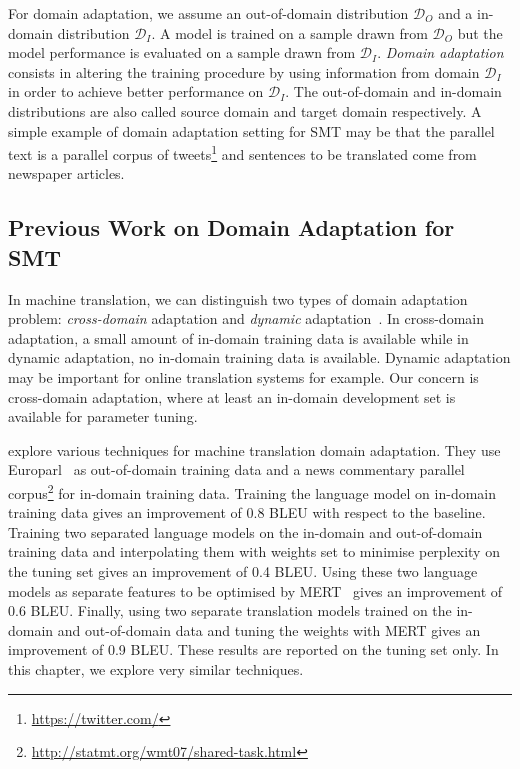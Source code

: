 For domain adaptation, we assume an out-of-domain distribution
$\mathcal{D}_O$ and a in-domain distribution $\mathcal{D}_I$.
A model is trained on
a sample drawn from $\mathcal{D}_O$ but the model performance
is evaluated on a sample drawn from $\mathcal{D}_I$.
\emph{Domain adaptation} consists in altering the training procedure
by using information from domain
$\mathcal{D}_I$ in order to achieve better performance on $\mathcal{D}_I$.
The out-of-domain and in-domain distributions are also called
source domain and target domain respectively.
A simple example of domain adaptation setting for SMT may be that
the parallel text is a parallel corpus of
tweets\footnote{\url{https://twitter.com/}} and sentences to be translated
come from newspaper articles.

\subsection{Previous Work on Domain Adaptation for SMT}
\label{sec:domainAdaptationSMTrelatedWork}



In machine translation, we can distinguish two types of domain
adaptation problem: \emph{cross-domain} adaptation and \emph{dynamic}
adaptation~\citep{foster-kuhn:2007:WMT}. In cross-domain adaptation,
a small amount of in-domain training data is available while
in dynamic adaptation, no in-domain training data is available.
Dynamic adaptation may be important for online translation systems for example.
Our concern is cross-domain adaptation, where at least an in-domain
development set is available for parameter tuning.

\citet{koehn-schroeder:2007:WMT} explore various techniques for
machine translation domain adaptation. They use
Europarl~\citep{koehn:2005:MTSummit} as out-of-domain
training data and a news commentary parallel
corpus\footnote{\url{http://statmt.org/wmt07/shared-task.html}}
for in-domain training data. Training the language model
on in-domain training data gives an improvement of 0.8 BLEU
with respect to the baseline. Training two separated language models
on the in-domain and out-of-domain training data and interpolating
them with weights set to minimise perplexity on the tuning set
gives an improvement of 0.4 BLEU. Using these two language models
as separate features to be optimised by MERT~\citep{och:2003:ACL}
gives an improvement of 0.6 BLEU. Finally, using two separate
translation models trained on the in-domain and out-of-domain
data and tuning the weights with MERT gives an improvement
of 0.9 BLEU. These results are reported on the tuning set only.
In this chapter, we explore very similar techniques.

